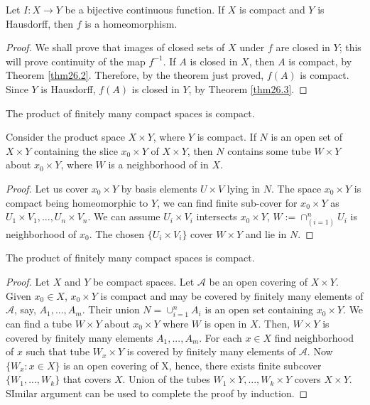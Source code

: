 \documentclass[a4paper,english,12pt]{article}
\begin{document}
\begin{thm}
	Let $I : X \rightarrow Y$ be a bijective continuous function. If $X$ is compact and $Y$ is Hausdorff, then $f$ is a homeomorphism.
\end{thm} 
\begin{proof}
	 We shall prove that images of closed sets of $X$ under $f$ are closed in $Y$; this will prove continuity of the map $f^{-1}$. If $A$ is closed in $X$, then $A$ is compact, by Theorem \ref{thm26.2}. Therefore, by the theorem just proved, $f(A)$ is compact. Since $Y$ is Hausdorff, $f(A)$ is closed in $Y$, by Theorem \ref{thm26.3}.
\end{proof}

\begin{thm}
	The product of finitely many compact spaces is compact.
\end{thm}

\begin{lem}
	Consider the product space $X \times Y$, where $Y$ is compact. If $N$ is an open set of $X \times Y$ containing the slice $x_0 \times Y$ of $X \times Y$, then $N$ contains some tube $W \times Y$ about $x_0 \times Y$, where $W$ is a neighborhood of in $X$.
\end{lem}
\begin{proof}
	Let us cover $x_0 \times Y$ by basis elements $U \times V$ lying in $N$. The space $x_0 \times Y$ is compact being homeomorphic to $Y$, we can find finite sub-cover for $x_0 \times Y$ as $U_1 \times V_1,...,U_n \times V_n$. We can assume $U_i \times V_i$ intersects $x_0 \times Y$, $W:=\cap_{(i=1)}^n U_i$ is neighborhood of $x_0$. The chosen $\{U_i \times V_i\}$ cover $W \times Y$ and lie in $N$.
\end{proof}

\begin{thm}
	The product of finitely many compact spaces is compact.
\end{thm}

\begin{proof}
	Let $X$ and $Y$ be compact spaces. Let $\mathcal{A}$ be an open covering of $X \times Y$. Given $x_0 \in X$, $x_0 \times Y$ is compact and may be covered by finitely many elements of $\mathcal{A}$, say, $A_1,..., A_m$. Their union $N=\cup_{i=1}^n A_i$ is an open set containing $x_0 \times Y$. We can find a tube $W \times Y$ about $x_0 \times Y$ where $W$ is open in $X$. Then, $W \times Y$ is covered by finitely many elements $A_1,...,A_m$.
	For each $x \in X$ find neighborhood of $x$ such that tube $W_x \times Y$ is covered by finitely many elements of $\mathcal{A}$. Now $\{W_x : x \in X\}$ is an open covering of X, hence, there exists finite subcover $\{W_1,..., W_k\}$ that covers $X$. Union of the tubes $W_1 \times Y,..., W_k \times Y$ covers $X \times Y$.
	SImilar argument can be used to complete the proof by induction.
\end{proof}
\end{document}

